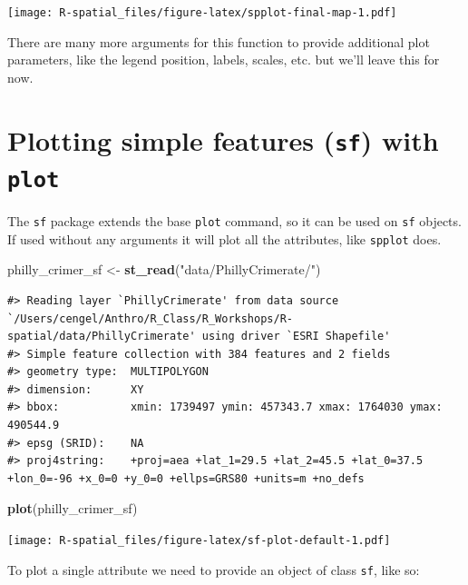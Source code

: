 \documentclass[]{book}
\newenvironment{Shaded}{\begin{snugshade}}{\end{snugshade}}
\newcommand{\KeywordTok}[1]{\textcolor[rgb]{0.13,0.29,0.53}{\textbf{#1}}}
\newcommand{\StringTok}[1]{\textcolor[rgb]{0.31,0.60,0.02}{#1}}
\newcommand{\CommentTok}[1]{\textcolor[rgb]{0.56,0.35,0.01}{\textit{#1}}}
\newcommand{\OperatorTok}[1]{\textcolor[rgb]{0.81,0.36,0.00}{\textbf{#1}}}
\newcommand{\NormalTok}[1]{#1}
\theoremstyle{definition}
\theoremstyle{definition}
\theoremstyle{definition}
\theoremstyle{remark}
\begin{document}
\texttt{[image: R-spatial\_files/figure-latex/spplot-final-map-1.pdf]}

There are many more arguments for this function to provide additional
plot parameters, like the legend position, labels, scales, etc. but
we'll leave this for now.

\section{\texorpdfstring{Plotting simple features (\texttt{sf}) with
\texttt{plot}}{Plotting simple features (sf) with plot}}\label{plotting-simple-features-sf-with-plot}

The \texttt{sf} package extends the base \texttt{plot} command, so it
can be used on \texttt{sf} objects. If used without any arguments it
will plot all the attributes, like \texttt{spplot} does.

\begin{Shaded}
\begin{Highlighting}[]
\NormalTok{philly_crimer_sf <-}\StringTok{  }\KeywordTok{st_read}\NormalTok{(}\StringTok{"data/PhillyCrimerate/"}\NormalTok{)}
\end{Highlighting}
\end{Shaded}

\begin{verbatim}
#> Reading layer `PhillyCrimerate' from data source `/Users/cengel/Anthro/R_Class/R_Workshops/R-spatial/data/PhillyCrimerate' using driver `ESRI Shapefile'
#> Simple feature collection with 384 features and 2 fields
#> geometry type:  MULTIPOLYGON
#> dimension:      XY
#> bbox:           xmin: 1739497 ymin: 457343.7 xmax: 1764030 ymax: 490544.9
#> epsg (SRID):    NA
#> proj4string:    +proj=aea +lat_1=29.5 +lat_2=45.5 +lat_0=37.5 +lon_0=-96 +x_0=0 +y_0=0 +ellps=GRS80 +units=m +no_defs
\end{verbatim}

\begin{Shaded}
\begin{Highlighting}[]
\KeywordTok{plot}\NormalTok{(philly_crimer_sf)}
\end{Highlighting}
\end{Shaded}

\texttt{[image: R-spatial\_files/figure-latex/sf-plot-default-1.pdf]}

To plot a single attribute we need to provide an object of class
\texttt{sf}, like so:

\begin{Shaded}
\end{Shaded}
\end{document}
